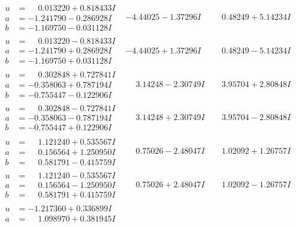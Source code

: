 \documentclass[1p]{elsarticle_modified}
\theoremstyle{definition}
\begin{document}
$$\begin{array}{c|c|c}
\begin{aligned}
u &= \phantom{-}0.013220 + 0.818433 I \\
a &= -1.241790 - 0.286928 I \\
b &= -1.169750 - 0.031128 I\end{aligned}
 & -4.44025 - 1.37296 I & \phantom{-}0.48249 + 5.14234 I \\ \hline\begin{aligned}
u &= \phantom{-}0.013220 - 0.818433 I \\
a &= -1.241790 + 0.286928 I \\
b &= -1.169750 + 0.031128 I\end{aligned}
 & -4.44025 + 1.37296 I & \phantom{-}0.48249 - 5.14234 I \\ \hline\begin{aligned}
u &= \phantom{-}0.302848 + 0.727841 I \\
a &= -0.358063 + 0.787194 I \\
b &= -0.755447 - 0.122906 I\end{aligned}
 & \phantom{-}3.14248 - 2.30749 I & \phantom{-}3.95704 + 2.80848 I \\ \hline\begin{aligned}
u &= \phantom{-}0.302848 - 0.727841 I \\
a &= -0.358063 - 0.787194 I \\
b &= -0.755447 + 0.122906 I\end{aligned}
 & \phantom{-}3.14248 + 2.30749 I & \phantom{-}3.95704 - 2.80848 I \\ \hline\begin{aligned}
u &= \phantom{-}1.121240 + 0.535567 I \\
a &= \phantom{-}0.156564 + 1.250950 I \\
b &= \phantom{-}0.581791 - 0.415759 I\end{aligned}
 & \phantom{-}0.75026 - 2.48047 I & \phantom{-}1.02092 + 1.26757 I \\ \hline\begin{aligned}
u &= \phantom{-}1.121240 - 0.535567 I \\
a &= \phantom{-}0.156564 - 1.250950 I \\
b &= \phantom{-}0.581791 + 0.415759 I\end{aligned}
 & \phantom{-}0.75026 + 2.48047 I & \phantom{-}1.02092 - 1.26757 I \\ \hline\begin{aligned}
u &= -1.217360 + 0.336899 I \\
a &= \phantom{-}1.098970 + 0.381945 I \\

\end{aligned}
\end{array}$$
\end{document}
